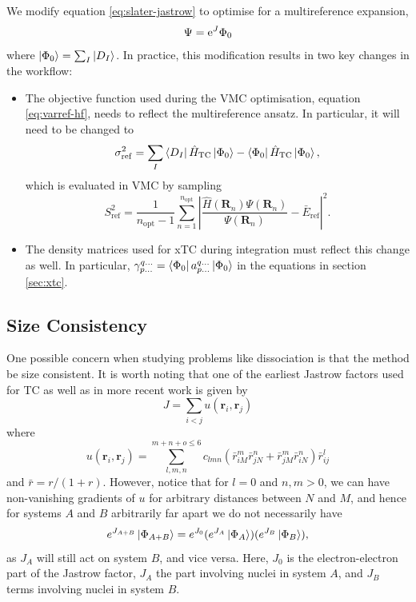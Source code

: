 We modify equation \ref{eq:slater-jastrow} to optimise for a multireference expansion,
\begin{equation}
    \label{eq:general-slater-jastrow}
    \Psi = \mathrm{e}^J\Phi_0
\end{equation}
where $\ket{\Phi_0}=\sum_I\ket{D_I}$. In practice, this modification results in two key changes in the workflow:
\begin{itemize}
    \item The objective function used during the VMC optimisation, equation \ref{eq:varref-hf}, needs to reflect the multireference ansatz. In particular, it will need to be changed to
    \begin{equation}
        \label{eq:varref-md}
        \sigma_\mathrm{ref}^2 = \sum_{I}\bra{D_I}\hat H_\mathrm{TC}\ket{\Phi_0} - \bra{\Phi_0}\hat H_\mathrm{TC}\ket{\Phi_0},
    \end{equation}
    which is evaluated in VMC by sampling
    \begin{equation}
        S_\mathrm{ref}^2 =
          \frac 1 {n_\mathrm{opt}-1}
          \sum_{n=1}^{n_\mathrm{opt}}
            \left| \frac {\hat H({\bm R}_n) \Psi({\bm R}_n)}
                         {\Psi({\bm R}_n)} - {\bar E}_\mathrm{ref}
            \right|^2.
    \end{equation}
    \item The density matrices used for xTC during integration must reflect this change as well. In particular, $\gamma_{p\dots}^{q\dots}=\bra{\Phi_0} a_{p\dots}^{q\dots}\ket{\Phi_0}$ in the equations in section \ref{sec:xtc}.
\end{itemize}

\subsection{Size Consistency}

One possible concern when studying problems like dissociation is that the method be size consistent. It is worth noting that one of the earliest Jastrow factors used for TC\supercite{boysCalculation1969} as well as in more recent work\supercite{cohenSimilarity2019} is given by
\begin{equation}
\label{eq:boyshandyjastrow}
J = \sum_{i<j} u(\bm r_i, \bm r_j)
\end{equation}
where
\begin{equation}
u(\bm r_i, \bm r_j) = \sum_{l,m,n}^{m+n+o\leq 6} c_{lmn}(\bar r_{iM}^m\bar r_{jN}^n+\bar r_{jM}^m\bar r_{iN}^n)\bar r_{ij}^l
\end{equation}
and $\bar r = r/(1+r)$.
However, notice that for $l=0$ and $n,m>0$, we can have non-vanishing gradients of $u$ for arbitrary distances between $N$ and $M$, and hence for systems $A$ and $B$ arbitrarily far apart we do not necessarily have
\begin{equation}
\label{eq:size-consistency}
e^{J_{A+B}}\ket{\Phi_{A+B}} = e^{J_0}(e^{J_{A}}\ket{\Phi_{A}})(e^{J_{B}}\ket{\Phi_{B}}),
\end{equation}
as $J_A$ will still act on system $B$, and vice versa. Here, $J_0$ is the electron-electron part of the Jastrow factor, $J_A$ the part involving nuclei in system $A$, and $J_B$ terms involving nuclei in system $B$.

